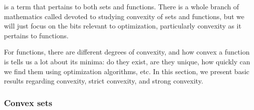  is a term that pertains to both sets and functions.
There is a whole branch of mathematics called  devoted to studying convexity of sets and functions, but we will just focus on the bits relevant to optimization, particularly convexity as it pertains to functions.

For functions, there are different degrees of convexity, and how convex a function is tells us a lot about its minima: do they exist, are they unique, how quickly can we find them using optimization algorithms, etc.
In this section, we present basic results regarding convexity, strict convexity, and strong convexity.

\subsubsection{Convex sets}
